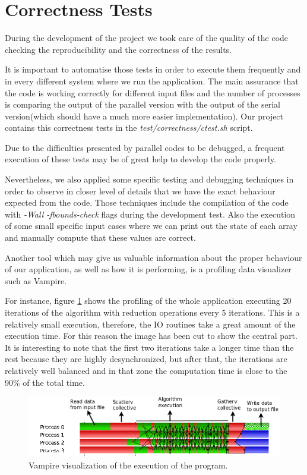 \documentclass[12pt, a4paper, oneside]{article}
\begin{document}
\section{Correctness Tests}
During the development of the project we took care of the quality of the code checking the reproducibility and the correctness of the results.

It is important to automatise those tests in order to execute them frequently and in every different system where we run the application. 
The main assurance that the code is working correctly for different input files and the number of processes is comparing the output of the parallel version with the output of the serial version(which should have a much more easier implementation).
Our project contains this correctness tests in the \emph{test/correctness/ctest.sh} script.

Due to the difficulties presented by parallel codes to be debugged, a frequent execution of these tests may be of great help to develop the code properly.

Nevertheless, we also applied some specific testing and debugging techniques in order to observe in closer level of details that we have the exact behaviour expected from the code.
Those techniques include the compilation of the code with \emph{-Wall -fbounds-check} flags during the development test.
Also the execution of some small specific input cases where we can print out the state of each array and manually compute that these values are correct.


Another tool which may give us valuable information about the proper behaviour of our application, as well as how it is performing, is a profiling data visualizer such as Vampire.

For instance, figure \ref{figure:complete} shows the profiling of the whole application executing 20 iterations of the algorithm with reduction operations every 5 iterations. This is a relatively small execution, therefore, the IO routines take a great amount of the execution time. For this reason the image has been cut to show the central part.
It is interesting to note that the first two iterations take a longer time than the rest because they are highly desynchronized, but after that, the iterations are relatively well balanced and in that zone the computation time is close to the 90\% of the total time.

\begin{figure}[htbp]
 \centering
 \includegraphics[width=\textwidth]{completemodif}
 \caption{Vampire visualization of the execution of the program.}
 \label{figure:complete}
\end{figure}
\end{document}
